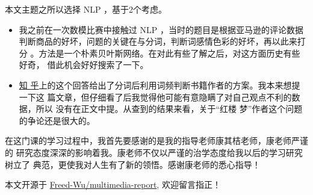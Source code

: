 \documentclass[../main]{subfiles}
\begin{document}
\begin{acknowledgement}
  本文主题之所以选择 NLP ，基于2个考虑。

  \begin{itemize}
    \item 我之前在一次数模比赛中接触过 NLP ，当时的题目是根据亚马逊的评论数据
      判断商品的好坏，问题的关键在与分词，判断词感情色彩的好坏，再以此来打分
      。方法是一个朴素贝叶斯网络。在对此有些了解之后，对这方面历史有些好奇，
      借此机会好好搜索了一下。
    \item\href{https://www.zhihu.com/question/285719774/answer/1020515592}{知
      乎}上的这个回答给出了分词后利用词频判断书籍作者的方案。我本来想提一下这
      篇文章，但仔细看了后我觉得他可能有意隐瞒了对自己观点不利的数据，所以
      没有在正文中提。从查到的结果来看，关于\enquote{红楼
      梦}作者这个问题的争论还是很大的。
  \end{itemize}

  在这门课的学习过程中，我首先要感谢的是我的指导老师康其桔老师，康老师严谨的
  研究态度深深的影响着我。康老师不仅以严谨的治学态度给我以后的学习研究树立了
  典范，更使我对人生有了新的领悟。感谢康老师的悉心指导！

  本文开源于
  \href{https://github.com/Freed-Wu/multimedia-report}{Freed-Wu/multimedia-report},
  欢迎留言指正！
\end{acknowledgement}
\end{document}
